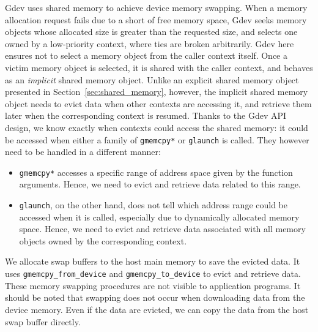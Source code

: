 Gdev uses shared memory to achieve device memory swapping.
When a memory allocation request fails due to a short of free memory
space, Gdev seeks memory objects whose allocated size is greater than
the requested size, and selects one owned by a low-priority context,
where ties are broken arbitrarily.
Gdev here ensures not to select a memory object from the caller context
itself.
Once a victim memory object is selected, it is shared with the caller
context, and behaves as an \textit{implicit} shared memory object.
Unlike an explicit shared memory object presented in
Section~\ref{sec:shared_memory}, however, the implicit shared memory
object needs to evict data when other contexts are accessing it, and
retrieve them later when the corresponding context is resumed.
Thanks to the Gdev API design, we know exactly when contexts could
access the shared memory: it could be accessed when either a family of
\texttt{gmemcpy*} or \texttt{glaunch} is called.
They however need to be handled in a different manner:
\begin{itemize}
 \vspace{-0.25em}
 \item \texttt{gmemcpy*} accesses a specific range of address space
       given by the function arguments.
       Hence, we need to evict and retrieve data related to this range.
 \vspace{-0.5em}
 \item \texttt{glaunch}, on the other hand, does not tell which address
       range could be accessed when it is called, especially due to
       dynamically allocated memory space.
       Hence, we need to evict and retrieve data associated with all
       memory objects owned by the corresponding context.
 \vspace{-0.25em}
\end{itemize}

We allocate swap buffers to the host main memory to save the evicted
data.
It uses \texttt{gmemcpy\_from\_device} and \texttt{gmemcpy\_to\_device}
to evict and retrieve data.
These memory swapping procedures are not visible to application programs.
It should be noted that swapping does not occur when downloading data
from the device memory.
Even if the data are evicted, we can copy the data from the host swap
buffer directly.

